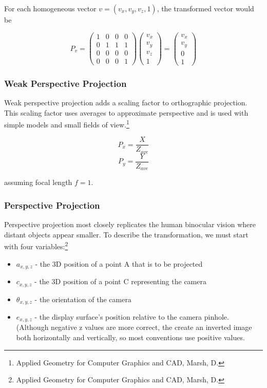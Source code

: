 \documentclass{article}
\begin{document}
For each homogeneous vector $v = (v_{x}, v_{y}, v_{z}, 1)$, the transformed vector would be

\[P_{v} = \begin{pmatrix}
  1 & 0 & 0 & 0 \\
  0 & 1 & 1 & 1 \\
  0 & 0 & 0 & 0 \\
  0 & 0 & 0 & 1 
 \end{pmatrix}	
\begin{pmatrix}
  v_{x} \\
  v_{y} \\
  v_{z} \\
  1
 \end{pmatrix}	
=
\begin{pmatrix}
  v_{x} \\
  v_{y} \\
  0 \\
  1
 \end{pmatrix}\]

\subsubsection{Weak Perspective Projection}
Weak perspective projection adds a scaling factor to orthographic projection. This scaling factor uses averages to approximate perspective and is used with simple models and small fields of view.\footnote{Applied Geometry for Computer Graphics and CAD, Marsh, D.}

  \[P_{x} =  \frac{X}{Z_{ave}}\]
  \[P_{y} =  \frac{Y}{Z_{ave}}\]

assuming focal length $f = 1$.

\subsubsection{Perspective Projection}
Perspective projection most closely replicates the human binocular vision where distant objects appear smaller. To describe the transformation, we must start with four variables:\footnote{Applied Geometry for Computer Graphics and CAD, Marsh, D.}

\begin{itemize}
  \item $a_{x, y, z}$ - the 3D position of a point A that is to be projected
  \item $c_{x, y, z}$ - the 3D position of a point C representing the camera
  \item $\theta_{x, y, z}$ - the orientation of the camera
  \item $e_{x, y, z}$ - the display surface's position relative to the camera pinhole. (Although negative z values are more correct, the create an inverted image both horizontally and vertically, so most conventions use positive values.
\end{itemize}
\end{document}
